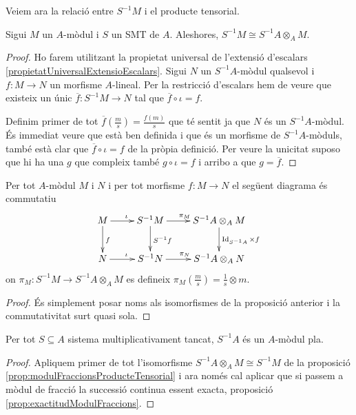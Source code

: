 \documentclass[../../../main.tex]{subfiles}
\begin{document}
Veiem ara la relació entre $S^{-1}M$ i el producte tensorial.

\begin{prop}
\label{prop:modulFraccionsProducteTensorial} Sigui $M$ un $A$-mòdul i $S$ un SMT de $A$. Aleshores, $S^{-1}M\cong S^{-1}A\otimes_AM$.
\end{prop}
\begin{proof}
Ho farem utilitzant la propietat universal de l'extensió d'escalars \ref{propietatUniversalExtensioEscalars}. Sigui $N$ un $S^{-1}A$-mòdul qualsevol i $f:M\to N$ un morfisme $A$-lineal. Per la restricció d'escalars hem de veure que existeix un únic $\overline{f}:S^{-1}M\to N$ tal que $\overline{f}\circ\iota = f$. 

Definim primer de tot $\overline{f}(\frac{m}{s}) = \frac{f(m)}{s}$ que té sentit ja que $N$ és un $S^{-1}A$-mòdul. És immediat veure que està ben definida i que és un morfisme de $S^{-1}A$-mòduls, també està clar que $\overline{f}\circ \iota = f$ de la pròpia definició. Per veure la unicitat suposo que hi ha una $g$ que compleix també $g\circ\iota = f$ i arribo a que $g = \overline{f}$.
\end{proof}




\begin{coro}
Per tot $A$-mòdul $M$ i $N$ i per tot morfisme $f:M\to N$ el següent diagrama és commutatiu
\begin{equation}
    \notag
    \xymatrix{
    M\ar[r]^\iota\ar[d]^f & S^{-1}M\ar[d]^{S^{-1}f}\ar[r]^{\pi_M} & S^{-1}A\otimes_AM\ar[d]^{\id_{S^{-1}A}\times f} \\
    N\ar[r]^\iota & S^{-1}N\ar[r]^{\pi_N} & S^{-1}A\otimes_AN
    }
\end{equation}
on $\pi_M:S^{-1}M\to S^{-1}A\otimes_AM$ es defineix $\pi_M(\frac{m}{s}) = \frac{1}{s}\otimes m$.
\end{coro}
\begin{proof}
És simplement posar noms als isomorfismes de la proposició anterior i la commutativitat surt quasi sola.
\end{proof}




\begin{coro}
Per tot $S\subseteq A$ sistema multiplicativament tancat, $S^{-1}A$ és un $A$-mòdul pla.
\end{coro}
\begin{proof}
Apliquem primer de tot l'isomorfisme $S^{-1}A\otimes_AM\cong S^{-1}M$ de la proposició \ref{prop:modulFraccionsProducteTensorial} i ara només cal aplicar que si passem a mòdul de fracció la successió continua essent exacta, proposició \ref{prop:exactitudModulFraccions}.
\end{proof}
\end{document}
